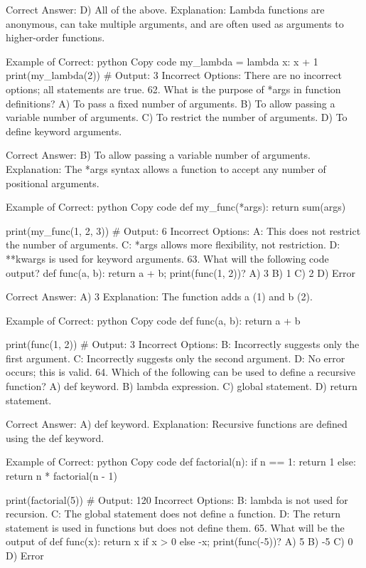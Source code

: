 Correct Answer: D) All of the above.
Explanation: Lambda functions are anonymous, can take multiple arguments, and are often used as arguments to higher-order functions.

Example of Correct:
python
Copy code
my_lambda = lambda x: x + 1
print(my_lambda(2))  # Output: 3
Incorrect Options: There are no incorrect options; all statements are true.
62. What is the purpose of *args in function definitions?
A) To pass a fixed number of arguments.
B) To allow passing a variable number of arguments.
C) To restrict the number of arguments.
D) To define keyword arguments.

Correct Answer: B) To allow passing a variable number of arguments.
Explanation: The *args syntax allows a function to accept any number of positional arguments.

Example of Correct:
python
Copy code
def my_func(*args):
    return sum(args)

print(my_func(1, 2, 3))  # Output: 6
Incorrect Options:
A: This does not restrict the number of arguments.
C: *args allows more flexibility, not restriction.
D: **kwargs is used for keyword arguments.
63. What will the following code output? def func(a, b): return a + b; print(func(1, 2))?
A) 3
B) 1
C) 2
D) Error

Correct Answer: A) 3
Explanation: The function adds a (1) and b (2).

Example of Correct:
python
Copy code
def func(a, b):
    return a + b

print(func(1, 2))  # Output: 3
Incorrect Options:
B: Incorrectly suggests only the first argument.
C: Incorrectly suggests only the second argument.
D: No error occurs; this is valid.
64. Which of the following can be used to define a recursive function?
A) def keyword.
B) lambda expression.
C) global statement.
D) return statement.

Correct Answer: A) def keyword.
Explanation: Recursive functions are defined using the def keyword.

Example of Correct:
python
Copy code
def factorial(n):
    if n == 1:
        return 1
    else:
        return n * factorial(n - 1)

print(factorial(5))  # Output: 120
Incorrect Options:
B: lambda is not used for recursion.
C: The global statement does not define a function.
D: The return statement is used in functions but does not define them.
65. What will be the output of def func(x): return x if x > 0 else -x; print(func(-5))?
A) 5
B) -5
C) 0
D) Error

